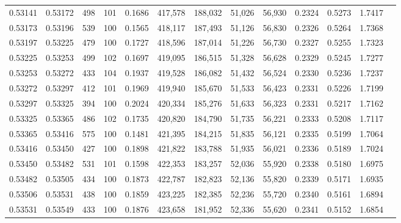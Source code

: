 \begin{tabular}{rrrrrrrrrrrrr}
0.53141 & 0.53172 &   498 & 101 &                                     0.1686 & 417,578 & 188,032 &  51,026 &  56,930 & 0.2324 & 0.5273 & 1.7417 \\
0.53173 & 0.53196 &   539 & 100 &                                     0.1565 & 418,117 & 187,493 &  51,126 &  56,830 & 0.2326 & 0.5264 & 1.7368 \\
0.53197 & 0.53225 &   479 & 100 &                                     0.1727 & 418,596 & 187,014 &  51,226 &  56,730 & 0.2327 & 0.5255 & 1.7323 \\
0.53225 & 0.53253 &   499 & 102 &                                     0.1697 & 419,095 & 186,515 &  51,328 &  56,628 & 0.2329 & 0.5245 & 1.7277 \\
0.53253 & 0.53272 &   433 & 104 &                                     0.1937 & 419,528 & 186,082 &  51,432 &  56,524 & 0.2330 & 0.5236 & 1.7237 \\
0.53272 & 0.53297 &   412 & 101 &                                     0.1969 & 419,940 & 185,670 &  51,533 &  56,423 & 0.2331 & 0.5226 & 1.7199 \\
0.53297 & 0.53325 &   394 & 100 &                                     0.2024 & 420,334 & 185,276 &  51,633 &  56,323 & 0.2331 & 0.5217 & 1.7162 \\
0.53325 & 0.53365 &   486 & 102 &                                     0.1735 & 420,820 & 184,790 &  51,735 &  56,221 & 0.2333 & 0.5208 & 1.7117 \\
0.53365 & 0.53416 &   575 & 100 &                                     0.1481 & 421,395 & 184,215 &  51,835 &  56,121 & 0.2335 & 0.5199 & 1.7064 \\
0.53416 & 0.53450 &   427 & 100 &                                     0.1898 & 421,822 & 183,788 &  51,935 &  56,021 & 0.2336 & 0.5189 & 1.7024 \\
0.53450 & 0.53482 &   531 & 101 &                                     0.1598 & 422,353 & 183,257 &  52,036 &  55,920 & 0.2338 & 0.5180 & 1.6975 \\
0.53482 & 0.53505 &   434 & 100 &                                     0.1873 & 422,787 & 182,823 &  52,136 &  55,820 & 0.2339 & 0.5171 & 1.6935 \\
0.53506 & 0.53531 &   438 & 100 &                                     0.1859 & 423,225 & 182,385 &  52,236 &  55,720 & 0.2340 & 0.5161 & 1.6894 \\
0.53531 & 0.53549 &   433 & 100 &                                     0.1876 & 423,658 & 181,952 &  52,336 &  55,620 & 0.2341 & 0.5152 & 1.6854 \\

\end{tabular}
